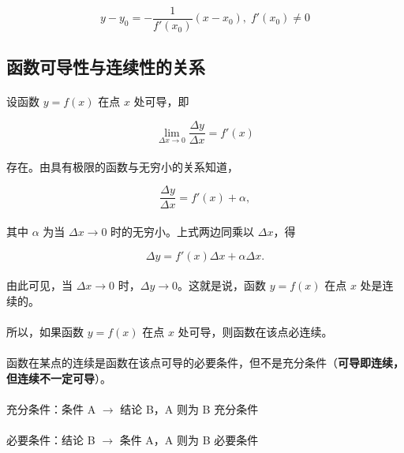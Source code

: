 \begin{equation}
y - y_0 = - \frac{1}{f'(x_0)}(x - x_0), \; f'(x_0) \neq 0
\end{equation}

\subsection{函数可导性与连续性的关系}
\paragraph{}
设函数 $y = f(x)$ 在点 $x$ 处可导，即

\begin{equation}
\lim_{\Delta x \to 0} \frac{\Delta y}{\Delta x} = f'(x)
\end{equation}

\paragraph{}
存在。由具有极限的函数与无穷小的关系知道，

\begin{equation}
\frac{\Delta y}{\Delta x} = f'(x) + \alpha ,
\end{equation}

\paragraph{}
其中 $\alpha$ 为当 $\Delta x \to 0$ 时的无穷小。上式两边同乘以 $\Delta x$，得

\begin{equation}
\Delta y = f'(x) \Delta x + \alpha\Delta x.
\end{equation}

\paragraph{}
由此可见，当 $\Delta x \to 0$ 时，$\Delta y \to 0$。这就是说，函数 $y = f(x)$ 在点 $x$ 处是连续的。

\paragraph{}
所以，如果函数 $y = f(x)$ 在点 $x$ 处可导，则函数在该点必连续。

\paragraph{}
函数在某点的连续是函数在该点可导的必要条件，但不是充分条件（\textbf{可导即连续，但连续不一定可导}）。

\paragraph{}
充分条件：条件 A $\to$ 结论 B，A 则为 B 充分条件

\paragraph{}
必要条件：结论 B $\to$ 条件 A，A 则为 B 必要条件
